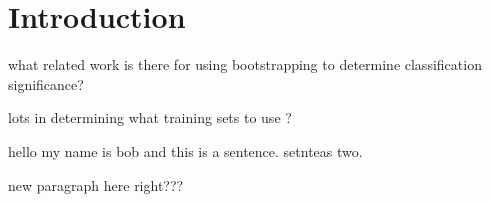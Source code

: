 \section{Introduction}

what related work is there for using bootstrapping to determine classification significance?

lots in determining what training sets to use ?

hello my name is bob and this is  a sentence. setnteas two.

new paragraph here right???
